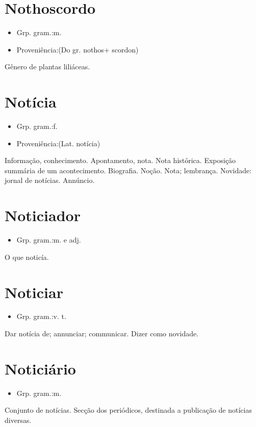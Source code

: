 \section{Nothoscordo}
\begin{itemize}
\item {Grp. gram.:m.}
\end{itemize}
\begin{itemize}
\item {Proveniência:(Do gr. \textunderscore nothos\textunderscore  + \textunderscore scordon\textunderscore )}
\end{itemize}
Gênero de plantas liliáceas.
\section{Notícia}
\begin{itemize}
\item {Grp. gram.:f.}
\end{itemize}
\begin{itemize}
\item {Proveniência:(Lat. \textunderscore notícia\textunderscore )}
\end{itemize}
Informação, conhecimento.
Apontamento, nota.
Nota histórica.
Exposição summária de um acontecimento.
Biografia.
Noção.
Nota; lembrança.
Novidade: \textunderscore jornal de notícias\textunderscore .
Annúncio.
\section{Noticiador}
\begin{itemize}
\item {Grp. gram.:m.  e  adj.}
\end{itemize}
O que noticía.
\section{Noticiar}
\begin{itemize}
\item {Grp. gram.:v. t.}
\end{itemize}
Dar notícia de; annunciar; communicar.
Dizer como novidade.
\section{Noticiário}
\begin{itemize}
\item {Grp. gram.:m.}
\end{itemize}
Conjunto de notícias.
Secção dos periódicos, destinada a publicação de notícias diversas.
